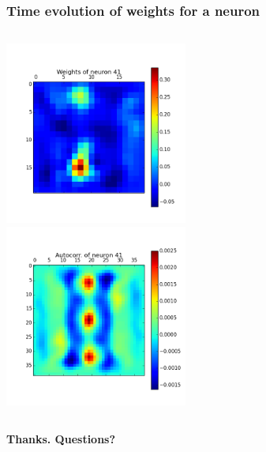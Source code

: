 \begin{frame}
\frametitle{Time evolution of weights for a neuron}
\begin{columns}[t]
\centering
\includegraphics[width=6cm,height=6cm]{neurons/neuron_w_41.png}\\
\centering
\includegraphics[width=6cm,height=6cm]{neurons/neuron_a_41.png}\\
\end{columns}
\end{frame}

\begin{frame}[c]
\begin{center}
{\huge \textbf{Thanks. Questions?}}
\end{center}
\end{frame}